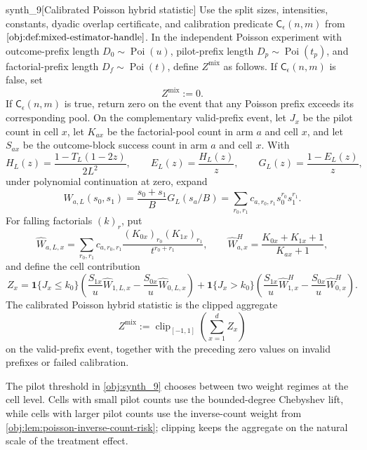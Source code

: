 \begin{definitionv}{synth_9}[Calibrated Poisson hybrid statistic]
Use the split sizes, intensities, constants, dyadic overlap certificate, and calibration predicate \(\mathsf C_\epsilon(n,m)\) from \(\cref{obj:def:mixed-estimator-handle}\). In the independent Poisson experiment with outcome-prefix length \(D_0\sim\operatorname{Poi}(u)\), pilot-prefix length \(D_p\sim\operatorname{Poi}(t_p)\), and factorial-prefix length \(D_f\sim\operatorname{Poi}(t)\), define \(Z^{\mathrm{mix}}\) as follows. If \(\mathsf C_\epsilon(n,m)\) is false, set
\[
Z^{\mathrm{mix}}:=0 .
\]
If \(\mathsf C_\epsilon(n,m)\) is true, return zero on the event that any Poisson prefix exceeds its corresponding pool. On the complementary valid-prefix event, let \(J_x\) be the pilot count in cell \(x\), let \(K_{ax}\) be the factorial-pool count in arm \(a\) and cell \(x\), and let \(S_{ax}\) be the outcome-block success count in arm \(a\) and cell \(x\). With
\[
H_L(z)=\frac{1-T_L(1-2z)}{2L^2},\qquad
E_L(z)=\frac{H_L(z)}{z},\qquad
G_L(z)=\frac{1-E_L(z)}{z},
\]
under polynomial continuation at zero, expand
\[
W_{a,L}(s_0,s_1)=\frac{s_0+s_1}{B}G_L(s_a/B)
=\sum_{r_0,r_1}c_{a,r_0,r_1}s_0^{r_0}s_1^{r_1}.
\]
For falling factorials \((k)_r\), put
\[
\widehat W_{a,L,x}
=\sum_{r_0,r_1}c_{a,r_0,r_1}
\frac{(K_{0x})_{r_0}(K_{1x})_{r_1}}{t^{r_0+r_1}},
\qquad
\widehat W^H_{a,x}
=\frac{K_{0x}+K_{1x}+1}{K_{ax}+1},
\]
and define the cell contribution
\[
Z_x=
\mathbf1\{J_x\le k_0\}
\left(\frac{S_{1x}}u\widehat W_{1,L,x}
-\frac{S_{0x}}u\widehat W_{0,L,x}\right)
+\mathbf1\{J_x>k_0\}
\left(\frac{S_{1x}}u\widehat W^H_{1,x}
-\frac{S_{0x}}u\widehat W^H_{0,x}\right).
\]
The calibrated Poisson hybrid statistic is the clipped aggregate
\[
Z^{\mathrm{mix}}
:=
\operatorname{clip}_{[-1,1]}\!\left(\sum_{x=1}^d Z_x\right)
\]
on the valid-prefix event, together with the preceding zero values on invalid prefixes or failed calibration.
\end{definitionv}

The pilot threshold in \cref{obj:synth_9} chooses between two weight regimes at the cell level. Cells with small pilot counts use the bounded-degree Chebyshev lift, while cells with larger pilot counts use the inverse-count weight from \cref{obj:lem:poisson-inverse-count-risk}; clipping keeps the aggregate on the natural scale of the treatment effect.

